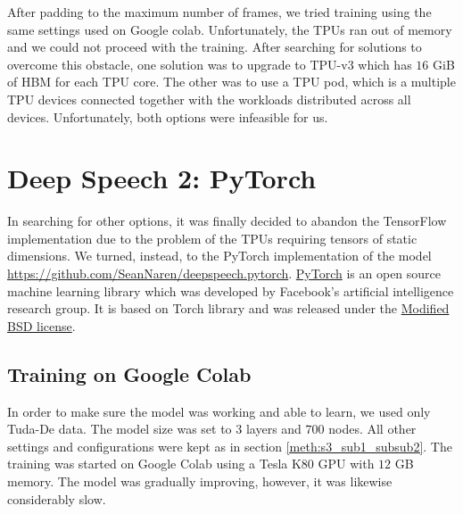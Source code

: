 After padding to the maximum number of frames, we tried training using the same settings used on Google colab. Unfortunately, the \ac{TPU}s ran out of memory and we could not proceed with the training. After searching for solutions to overcome this obstacle, one solution was to upgrade to TPU-v3 which has $16$ GiB of \ac{HBM} for each \ac{TPU} core. The other was to use a \ac{TPU} pod, which is a multiple \ac{TPU} devices connected together with the workloads distributed across all devices. Unfortunately, both options were infeasible for us.




































\section{Deep Speech 2: PyTorch}
\label{meth:s4}

In searching for other options, it was finally decided to abandon the TensorFlow implementation due to the problem of the \ac{TPU}s requiring tensors of static dimensions. We turned, instead, to the PyTorch implementation of the model \url{https://github.com/SeanNaren/deepspeech.pytorch}. 
\href{https://pytorch.org/}{PyTorch} is an open source machine learning library which was developed by 
Facebook's artificial intelligence research group. It is based on Torch library and was released under the \href{https://en.wikipedia.org/wiki/BSD_licenses#3-clause}{Modified BSD license}.

\subsection{Training on Google Colab}
\label{meth:s4_sub1}

In order to make sure the model was working and able to learn, we used only Tuda-De data. The model size was set to $3$ layers and $700$ nodes. All other settings and configurations were kept as in section \ref{meth:s3_sub1_subsub2}. The training was started on Google Colab using a Tesla K80 GPU with $12$ GB memory. The model was gradually improving, however, it was likewise considerably slow.

